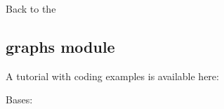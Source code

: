 \documentclass[letterpaper,10pt,english]{sphinxmanual}
\begin{document}
Back to the {\hyperref[techDoc:technical-label]{\emph{}}}


\subsection{graphs module}
\label{techDoc:graphs-label}\label{techDoc:graphs-module}
A tutorial with coding examples is available here: {\hyperref[tutorial:graphs-tutorial-label]{\emph{}}}
\label{techDoc:module-graphs}

\begin{fulllineitems}
\label{techDoc:graphs.BestDeterminedSpanningForest}
Bases: {\hyperref[techDoc:graphs.RandomTree]{\emph{}}}


\end{fulllineitems}
\end{document}
